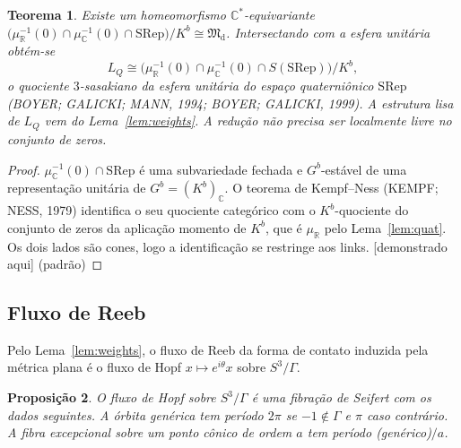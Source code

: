 \documentclass[11pt]{article}
\newtheorem{theorem}{Teorema}[section]
\newtheorem{proposition}[theorem]{Proposição}
\theoremstyle{definition}
\theoremstyle{remark}
\newcommand{\tagP}{\textsf{\small[demonstrado aqui]}}
\newcommand{\C}{\mathbb{C}}\newcommand{\R}{\mathbb{R}}\newcommand{\Z}{\mathbb{Z}}
\newcommand{\M}{\mathfrak{M}}\newcommand{\Rep}{\mathrm{Rep}}\newcommand{\SRep}{\mathrm{SRep}}
\begin{document}
\begin{theorem}\label{thm:D}
Existe um homeomorfismo $\C^*$-equivariante $\bigl(\mu_\R^{-1}(0)\cap\mu_\C^{-1}(0)\cap\SRep\bigr)/K^b\cong\M_{\mathrm d}$. Intersectando com a esfera unitária obtém-se
\[L_Q\cong\bigl(\mu_\R^{-1}(0)\cap\mu_\C^{-1}(0)\cap S(\SRep)\bigr)/K^b,\]
o quociente $3$-sasakiano da esfera unitária do espaço quaterniônico $\SRep$ (BOYER; GALICKI; MANN, 1994; BOYER; GALICKI, 1999). A estrutura lisa de $L_Q$ vem do Lema~\ref{lem:weights}. A redução não precisa ser localmente livre no conjunto de zeros.
\end{theorem}
\begin{proof}
$\mu_\C^{-1}(0)\cap\SRep$ é uma subvariedade fechada e $G^b$-estável de uma representação unitária de $G^b=(K^b)_\C$. O teorema de Kempf--Ness (KEMPF; NESS, 1979) identifica o seu quociente categórico com o $K^b$-quociente do conjunto de zeros da aplicação momento de $K^b$, que é $\mu_\R$ pelo Lema~\ref{lem:quat}. Os dois lados são cones, logo a identificação se restringe aos links. \tagP{} (padrão)
\end{proof}

\subsection{Fluxo de Reeb}
Pelo Lema~\ref{lem:weights}, o fluxo de Reeb da forma de contato induzida pela métrica plana é o fluxo de Hopf $x\mapsto e^{i\theta}x$ sobre $S^3/\Gamma$.

\begin{proposition}\label{prop:seifert}
O fluxo de Hopf sobre $S^3/\Gamma$ é uma fibração de Seifert com os dados seguintes. A órbita genérica tem período $2\pi$ se $-1\notin\Gamma$ e $\pi$ caso contrário. A fibra excepcional sobre um ponto cônico de ordem $a$ tem período (genérico)$/a$.
\end{proposition}
\end{document}
